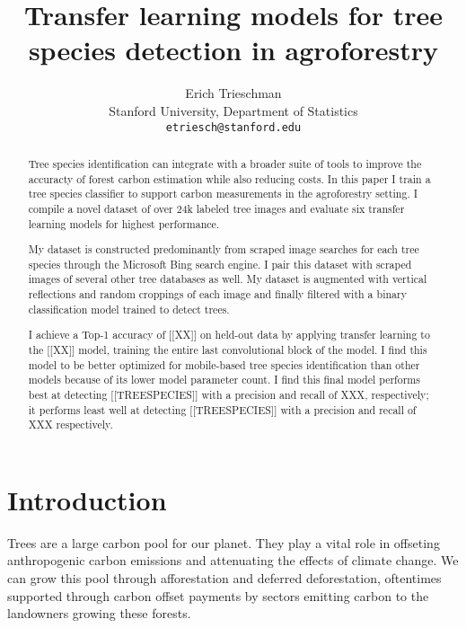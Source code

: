 \documentclass[10pt,twocolumn,letterpaper]{article}
\begin{document}
\title{Transfer learning models for tree species detection in agroforestry}

\author{Erich Trieschman\\
Stanford University, Department of Statistics\\
{\tt\small etriesch@stanford.edu}
}
\maketitle

\begin{abstract}
  Tree species identification can integrate with a broader suite of tools to improve the accuracty of forest carbon estimation while also reducing costs. In this paper I train a tree species classifier to support carbon measurements in the agroforestry setting. I compile a novel dataset of over 24k labeled tree images and evaluate six transfer learning models for highest performance. 
  
  My dataset is constructed predominantly from scraped image searches for each tree species through the Microsoft Bing search engine. I pair this dataset with scraped images of several other tree databases as well. My dataset is augmented with vertical reflections and random croppings of each image and finally filtered with a binary classification model trained to detect trees.
  
  I achieve a Top-1 accuracy of [[XX]] on held-out data by applying transfer learning to the [[XX]] model, training the entire last convolutional block of the model. I find this model to be better optimized for mobile-based tree species identification than other models because of its lower model parameter count. I find this final model performs best at detecting [[TREESPECIES]] with a precision and recall of XXX, respectively; it performs least well at detecting [[TREESPECIES]] with a precision and recall of XXX respectively.
\end{abstract}

\section{Introduction}
\label{sec:intro}
Trees are a large carbon pool for our planet. They play a vital role in offseting anthropogenic carbon emissions and attenuating the effects of climate change. We can grow this pool through afforestation and deferred deforestation, oftentimes supported through carbon offset payments by sectors emitting carbon to the landowners growing these forests. 
\end{document}
